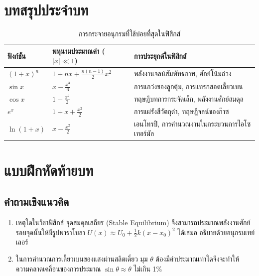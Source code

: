 \section{บทสรุปประจำบท}
\begin{table}[H]
    \centering
    \caption{การกระจายอนุกรมที่ใช้บ่อยที่สุดในฟิสิกส์}
    \label{tab:series_summary}
    \begin{tabularx}{\textwidth}{p{2.2cm}p{4.5cm}Y}
        \toprule
        \textbf{ฟังก์ชัน} & \textbf{พหุนามประมาณค่า ($|x| \ll 1$)} & \textbf{การประยุกต์ในฟิสิกส์} \\
        \midrule
        $(1+x)^n$ & $1 + nx + \frac{n(n-1)}{2}x^2$ & พลังงานจลน์สัมพัทธภาพ, ศักย์โน้มถ่วง \\
        $\sin x$ & $x - \frac{x^3}{6}$ & การแกว่งของลูกตุ้ม, การแทรกสอดเลี้ยวเบน \\
        $\cos x$ & $1 - \frac{x^2}{2}$ & ทฤษฎีบทการกระจัดเล็ก, พลังงานศักย์สมดุล \\
        $e^x$ & $1 + x + \frac{x^2}{2}$ & การแผ่รังสีวัตถุดำ, ทฤษฎีจลน์ของก๊าซ \\
        $\ln(1+x)$ & $x - \frac{x^2}{2}$ & เอนโทรปี, การคำนวณงานในกระบวนการไอโซเทอร์มัล \\
        \bottomrule
    \end{tabularx}
\end{table}

\clearpage
\section{แบบฝึกหัดท้ายบท}
\subsection{คำถามเชิงแนวคิด}
\begin{enumerate}
    \item เหตุใดในวิชาฟิสิกส์ จุดสมดุลเสถียร (Stable Equilibrium) จึงสามารถประมาณพลังงานศักย์รอบจุดนั้นให้มีรูปพาราโบลา $U(x) \approx U_0 + \frac{1}{2}k(x-x_0)^2$ ได้เสมอ อธิบายด้วยอนุกรมเทย์เลอร์
    \item ในการคำนวณการเลี้ยวเบนของแสงผ่านสลิตเดี่ยว มุม $\theta$ ต้องมีค่าประมาณเท่าใดจึงจะทำให้ความคลาดเคลื่อนของการประมาณ $\sin\theta \approx \theta$ ไม่เกิน 1\%
\end{enumerate}

